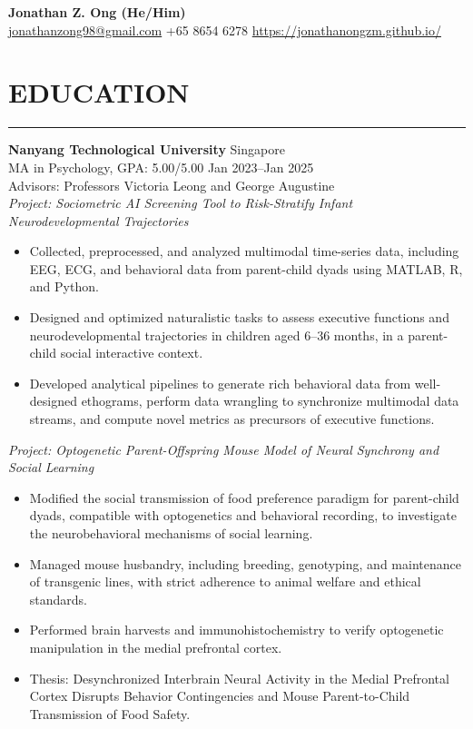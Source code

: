 \documentclass[11pt]{article}
\begin{document}
\begin{center}
    {\LARGE \textbf{Jonathan Z. Ong (He/Him)}} \\[0.5em]
    \faEnvelope \hspace{0.05cm} \href{mailto:jonathanzong98@gmail.com}{jonathanzong98@gmail.com} \hspace{0.2cm} 
    \faPhone \hspace{0.05cm} +65 8654 6278 \hspace{0.2cm} 
    \faGlobe \hspace{0.05cm} \url{https://jonathanongzm.github.io/}
\end{center}

\section*{EDUCATION}
\hrule
\textbf{Nanyang Technological University} \hfill Singapore \\
MA in Psychology, GPA: 5.00/5.00 \hfill Jan 2023--Jan 2025\\ 
Advisors: Professors Victoria Leong and George Augustine\\
\textit{Project: Sociometric AI Screening Tool to Risk-Stratify Infant Neurodevelopmental Trajectories}
\begin{itemize}[leftmargin=1.2cm]
    \item Collected, preprocessed, and analyzed multimodal time-series data, including EEG, ECG, and behavioral data from parent-child dyads using MATLAB, R, and Python.
    \item Designed and optimized naturalistic tasks to assess executive functions and neurodevelopmental trajectories in children aged 6–36 months, in a parent-child social interactive context.
    \item Developed analytical pipelines to generate rich behavioral data from well-designed ethograms, perform data wrangling to synchronize multimodal data streams, and compute novel metrics as precursors of executive functions.

\end{itemize}
\textit{Project: Optogenetic Parent-Offspring Mouse Model of Neural Synchrony and Social Learning}
\begin{itemize}[leftmargin=1.2cm]
    \item Modified the social transmission of food preference paradigm for parent-child dyads, compatible with optogenetics and behavioral recording, to investigate the neurobehavioral mechanisms of social learning.
    \item Managed mouse husbandry, including breeding, genotyping, and maintenance of transgenic lines, with strict adherence to animal welfare and ethical standards.
    \item Performed brain harvests and immunohistochemistry to verify optogenetic manipulation in the medial prefrontal cortex.
    \item Thesis: Desynchronized Interbrain Neural Activity in the Medial Prefrontal Cortex Disrupts Behavior Contingencies and Mouse Parent-to-Child Transmission of Food Safety.
\end{itemize}
\end{document}
